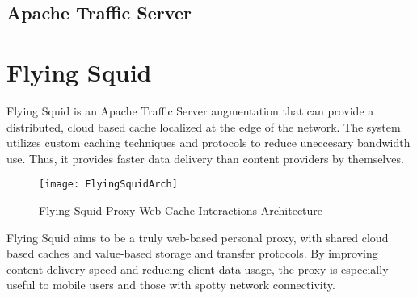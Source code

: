 \subsection{Apache Traffic Server}

\section{Flying Squid}

Flying Squid is an Apache Traffic Server augmentation that can provide a distributed, cloud based cache localized at the edge of the network. The system utilizes custom caching techniques and protocols to reduce uneccesary bandwidth use. Thus, it provides faster data delivery than content providers by themselves. 

\begin{figure}[H] \centering
\texttt{[image: FlyingSquidArch]}
\caption{Flying Squid Proxy Web-Cache Interactions Architecture}
\end{figure}

Flying Squid aims to be a truly web-based personal proxy, with shared cloud based caches and value-based storage and transfer protocols. By improving content delivery speed and reducing client data usage, the proxy is especially useful to mobile users and those with spotty network connectivity.